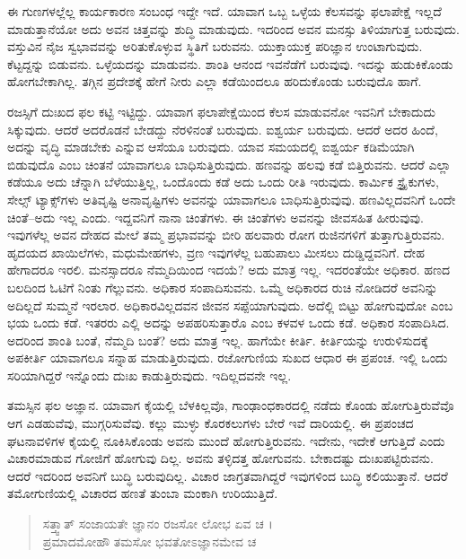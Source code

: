 ಈ ಗುಣಗಳಲ್ಲೆಲ್ಲ ಕಾರ್ಯಕಾರಣ ಸಂಬಂಧ ಇದ್ದೇ ಇದೆ. ಯಾವಾಗ ಒಬ್ಬ ಒಳ್ಳೆಯ ಕೆಲಸವನ್ನು ಫಲಾಪೇಕ್ಷೆ ಇಲ್ಲದೆ ಮಾಡುತ್ತಾನೆಯೋ ಅದು ಅವನ ಚಿತ್ತವನ್ನು ಶುದ್ಧಿ ಮಾಡುವುದು. ಇದರಿಂದ ಅವನ ಮನಸ್ಸು ತಿಳಿಯಾಗುತ್ತ ಬರುವುದು. ವಸ್ತುವಿನ ನೈಜ ಸ್ವಭಾವವನ್ನು ಅರಿತುಕೊಳ್ಳುವ ಸ್ಥಿತಿಗೆ ಬರುವನು. ಯುಕ್ತಾಯುಕ್ತ ಪರಿಜ್ಞಾನ ಉಂಟಾಗುವುದು. ಕೆಟ್ಟದ್ದನ್ನು ಬಿಡುವನು. ಒಳ್ಳೆಯದನ್ನು ಮಾಡುವನು. ಶಾಂತಿ ಆನಂದ ಇವನೆಡೆಗೆ ಬರುವುವು. ಇದನ್ನು ಹುಡುಕಿಕೊಂಡು ಹೋಗಬೇಕಾಗಿಲ್ಲ. ತಗ್ಗಿನ ಪ್ರದೇಶಕ್ಕೆ ಹೇಗೆ ನೀರು ಎಲ್ಲಾ ಕಡೆಯಿಂದಲೂ ಹರಿದುಕೊಂಡು ಬರುವುದೊ ಹಾಗೆ.

ರಜಸ್ಸಿಗೆ ದುಃಖದ ಫಲ ಕಟ್ಟಿ ಇಟ್ಟಿದ್ದು. ಯಾವಾಗ ಫಲಾಪೇಕ್ಷೆಯಿಂದ ಕೆಲಸ ಮಾಡುವನೋ ಇವನಿಗೆ ಬೇಕಾದುದು ಸಿಕ್ಕುವುದು. ಆದರೆ ಅದರೊಡನೆ ಬೇಡದ್ದು ನೆರಳಿನಂತೆ ಬರುವುದು. ಐಶ್ವರ್ಯ ಬರುವುದು. ಆದರೆ ಅದರ ಹಿಂದೆ, ಅದನ್ನು ವೃದ್ಧಿ ಮಾಡಬೇಕು ಎನ್ನುವ ಆಸೆಯೂ ಬರುವುದು. ಯಾವ ಸಮಯದಲ್ಲಿ ಐಶ್ವರ್ಯ ಕಡಿಮೆಯಾಗಿ ಬಿಡುವುದೊ ಎಂಬ ಚಿಂತನೆ ಯಾವಾಗಲೂ ಬಾಧಿಸುತ್ತಿರುವುದು. ಹಣವನ್ನು ಹಲವು ಕಡೆ ಬಿತ್ತಿರುವನು. ಆದರೆ ಎಲ್ಲಾ ಕಡೆಯೂ ಅದು ಚೆನ್ನಾಗಿ ಬೆಳೆಯುತ್ತಿಲ್ಲ, ಒಂದೊಂದು ಕಡೆ ಅದು ಒಂದು ರೀತಿ ಇರುವುದು. ಕಾರ್ಮಿಕ ಸ್ಟ್ರೈಕುಗಳು, ಸೇಲ್ಸ್ ಟ್ಯಾಕ್ಸ್​ಗಳು ಅತಿವೃಷ್ಟಿ ಅನಾವೃಷ್ಟಿಗಳು ಅವನನ್ನು ಯಾವಾಗಲೂ ಬಾಧಿಸುತ್ತಿರುವುವು. ಹಣವಿಲ್ಲದವನಿಗೆ ಒಂದೇ ಚಿಂತೆ--ಅದು ಇಲ್ಲ ಎಂದು. ಇದ್ದವನಿಗೆ ನಾನಾ ಚಿಂತೆಗಳು. ಈ ಚಿಂತೆಗಳು ಅವನನ್ನು ಜೀವಸಹಿತ ಹೀರುವುವು. ಇವುಗಳೆಲ್ಲ ಅವನ ದೇಹದ ಮೇಲೆ ತಮ್ಮ ಪ್ರಭಾವವನ್ನು ಬೀರಿ ಹಲವಾರು ರೋಗ ರುಜಿನಗಳಿಗೆ ತುತ್ತಾಗುತ್ತಿರುವನು. ಹೃದಯದ ಖಾಯಿಲೆಗಳು, ಮಧುಮೇಹಗಳು, ವ್ರಣ ಇವುಗಳೆಲ್ಲ ಬಹುಪಾಲು ಮೀಸಲು ದುಡ್ಡಿದ್ದವನಿಗೆ. ದೇಹ ಹೇಗಾದರೂ ಇರಲಿ. ಮನಸ್ಸಾದರೂ ನೆಮ್ಮದಿಯಿಂದ ಇದಯೆ? ಅದು ಮಾತ್ರ ಇಲ್ಲ. ಇದರಂತೆಯೇ ಅಧಿಕಾರ. ಹಣದ ಬಲದಿಂದ ಓಟಿಗೆ ನಿಂತು ಗೆಲ್ಲುವನು. ಅಧಿಕಾರ ಸಂಪಾದಿಸುವನು. ಒಮ್ಮೆ ಅಧಿಕಾರದ ರುಚಿ ನೋಡಿದರೆ ಅವನಿನ್ನು ಅದಿಲ್ಲದೆ ಸುಮ್ಮನೆ ಇರಲಾರ. ಅಧಿಕಾರವಿಲ್ಲದವನ ಜೀವನ ಸಪ್ಪೆಯಾಗುವುದು. ಅದೆಲ್ಲಿ ಬಿಟ್ಟು ಹೋಗುವುದೋ ಎಂಬ ಭಯ ಒಂದು ಕಡೆ. ಇತರರು ಎಲ್ಲಿ ಅದನ್ನು ಅಪಹರಿಸುತ್ತಾರೊ ಎಂಬ ಕಳವಳ ಒಂದು ಕಡೆ. ಅಧಿಕಾರ ಸಂಪಾದಿಸಿದ. ಅದರಿಂದ ಶಾಂತಿ ಬಂತೆ, ನೆಮ್ಮದಿ ಬಂತೆ? ಅದು ಮಾತ್ರ ಇಲ್ಲ. ಹಾಗೆಯೇ ಕೀರ್ತಿ. ಕೀರ್ತಿಯನ್ನು ಉರುಳಿಸುದಕ್ಕೆ ಅಪಕೀರ್ತಿ ಯಾವಾಗಲೂ ಸನ್ನಾಹ ಮಾಡುತ್ತಿರುವುದು. ರಜೋಗುಣಿಯ ಸುಖದ ಆಧಾರ ಈ ಪ್ರಪಂಚ. ಇಲ್ಲಿ ಒಂದು ಸರಿಯಾಗಿದ್ದರೆ ಇನ್ನೊಂದು ದುಃಖ ಕಾಡುತ್ತಿರುವುದು. ಇದಿಲ್ಲದವನೇ ಇಲ್ಲ.

ತಮಸ್ಸಿನ ಫಲ ಅಜ್ಞಾನ. ಯಾವಾಗ ಕೈಯಲ್ಲಿ ಬೆಳಕಿಲ್ಲವೊ, ಗಾಂಢಾಂಧಕಾರದಲ್ಲಿ ನಡೆದು ಕೊಂಡು ಹೋಗುತ್ತಿರುವೆವೊ ಆಗ ಎಡಹುವೆವು, ಮುಗ್ಗರಿಸುವೆವು. ಕಲ್ಲು ಮುಳ್ಳು ಕೊರಕಲುಗಳು ಬೇರೆ ಇವೆ ದಾರಿಯಲ್ಲಿ. ಈ ಪ್ರಪಂಚದ ಘಟನಾವಳಿಗಳ ಕೈಯಲ್ಲಿ ನೂಕಿಸಿಕೊಂಡು ಅವನು ಮುಂದೆ ಹೋಗುತ್ತಿರುವನು. ಇದೇನು, ಇದೇಕೆ ಆಗುತ್ತಿದೆ ಎಂದು ವಿಚಾರಮಾಡುವ ಗೋಜಿಗೆ ಹೋಗುವು ದಿಲ್ಲ. ಅವನು ತಳ್ಳಿದತ್ತ ಹೋಗುವನು. ಬೇಕಾದಷ್ಟು ದುಃಖಪಟ್ಟಿರುವನು. ಆದರೆ ಇದರಿಂದ ಅವನಿಗೆ ಬುದ್ಧಿ ಬರುವುದಿಲ್ಲ. ವಿಚಾರ ಜಾಗ್ರತವಾಗಿದ್ದರೆ ಇವುಗಳಿಂದ ಬುದ್ಧಿ ಕಲಿಯುತ್ತಾನೆ. ಆದರೆ ತಮೋಗುಣಿಯಲ್ಲಿ ವಿಚಾರದ ಹಣತೆ ತುಂಬಾ ಮಂಕಾಗಿ ಉರಿಯುತ್ತಿದೆ.

\begin{verse}
ಸತ್ತ್ವಾತ್ ಸಂಜಾಯತೇ ಜ್ಞಾನಂ ರಜಸೋ ಲೋಭ ಏವ ಚ ।\\ಪ್ರಮಾದಮೋಹೌ ತಮಸೋ ಭವತೋಽಜ್ಞಾನಮೇವ ಚ 
\end{verse}

